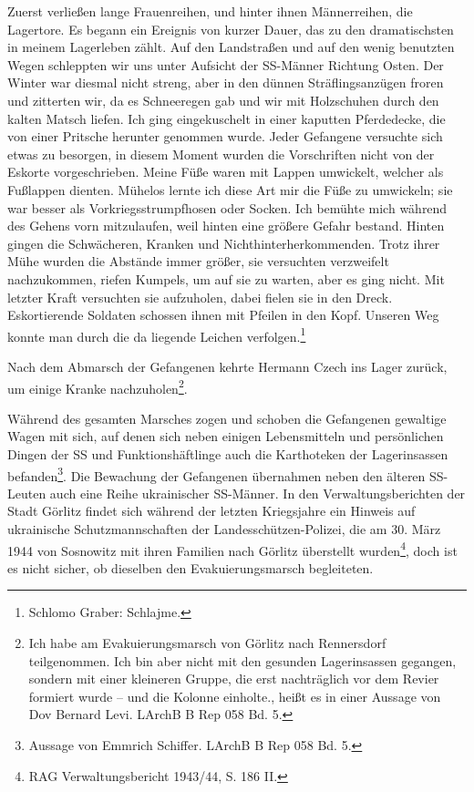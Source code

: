 \begin{leftbar}
Zuerst verließen lange Frauenreihen, und hinter ihnen Männerreihen, die Lagertore.\newline
Es begann ein Ereignis von kurzer Dauer, das zu den dramatischsten in meinem Lagerleben zählt. Auf den Landstraßen und auf den wenig benutzten Wegen schleppten wir uns unter Aufsicht der SS-Männer Richtung Osten. Der Winter war diesmal nicht streng, aber in den dünnen Sträflingsanzügen froren und zitterten wir, da es Schneeregen gab und wir mit Holzschuhen durch den kalten Matsch liefen. Ich ging eingekuschelt in einer kaputten Pferdedecke, die von einer Pritsche herunter genommen wurde. Jeder Gefangene versuchte sich etwas zu besorgen, in diesem Moment wurden die Vorschriften nicht von der Eskorte vorgeschrieben. Meine Füße waren mit Lappen umwickelt, welcher als Fußlappen dienten. Mühelos lernte ich diese Art mir die Füße zu umwickeln; sie war besser als Vorkriegsstrumpfhosen oder Socken.\newline
Ich bemühte mich während des Gehens vorn mitzulaufen, weil hinten eine größere Gefahr bestand. Hinten gingen die Schwächeren, Kranken und Nichthinterherkommenden. Trotz ihrer Mühe wurden die Abstände immer größer, sie versuchten verzweifelt nachzukommen, riefen Kumpels, um auf sie zu warten, aber es ging nicht. Mit letzter Kraft versuchten sie aufzuholen, dabei fielen sie in den Dreck. Eskortierende Soldaten schossen ihnen mit Pfeilen in den Kopf. Unseren Weg konnte man durch die da liegende Leichen verfolgen.\footnote{Schlomo Graber: Schlajme.}
\end{leftbar}

Nach dem Abmarsch der Gefangenen kehrte Hermann Czech ins Lager zurück, um einige Kranke nachzuholen\footnote{\glqq Ich habe am Evakuierungsmarsch von Görlitz nach Rennersdorf teilgenommen. Ich bin aber nicht mit den gesunden Lagerinsassen gegangen, sondern mit einer kleineren Gruppe, die erst nachträglich vor dem Revier formiert wurde -- und die Kolonne einholte.\grqq, heißt es in einer Aussage von Dov Bernard Levi. LArchB B Rep 058 Bd. 5.}.

Während des gesamten Marsches zogen und schoben die Gefangenen gewaltige Wagen mit sich, auf denen sich neben einigen Lebensmitteln und persönlichen Dingen der SS und Funktionshäftlinge auch die Karthoteken der Lagerinsassen befanden\footnote{Aussage von Emmrich Schiffer. LArchB B Rep 058 Bd. 5.}. Die Bewachung der Gefangenen übernahmen neben den älteren SS-Leuten auch eine Reihe ukrainischer SS-Männer. In den Verwaltungsberichten der Stadt Görlitz findet sich während der letzten Kriegsjahre ein Hinweis auf ukrainische Schutzmannschaften der Landesschützen-Polizei, die am 30. März 1944 von Sosnowitz mit ihren Familien nach Görlitz überstellt wurden\footnote{RAG Verwaltungsbericht 1943/44, S. 186 II.}, doch ist es nicht sicher, ob dieselben den Evakuierungsmarsch begleiteten. 

